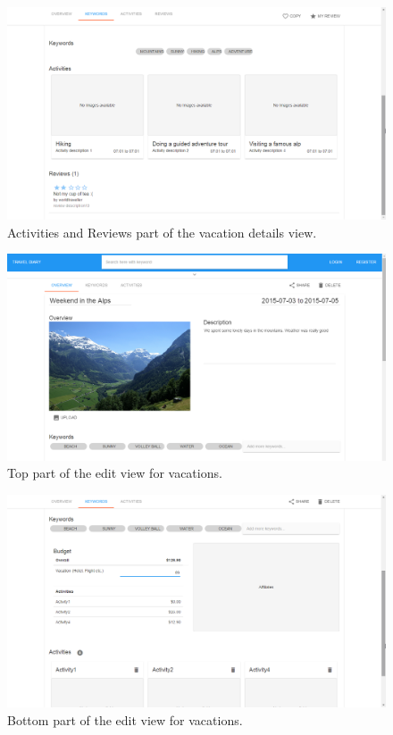 \documentclass[IN,english]{tumbook}
\begin{document}
\begin{figure}
	\includegraphics[width=\textwidth]{pictures/UseCase4_2}	
	\caption{Activities and Reviews part of the vacation details view.}
	\label{fig:vacation-details-2}
\end{figure}

\begin{figure}
	\includegraphics[width=\textwidth]{pictures/UseCase4_3}
	\caption{Top part of the edit view for vacations.}
	\label{fig:vacation-edit-1}
\end{figure}

\begin{figure}
	\includegraphics[width=\textwidth]{pictures/UseCase4_4}
	\caption{Bottom part of the edit view for vacations.}
	\label{fig:vacation-edit-2}
\end{figure}
\end{document}
